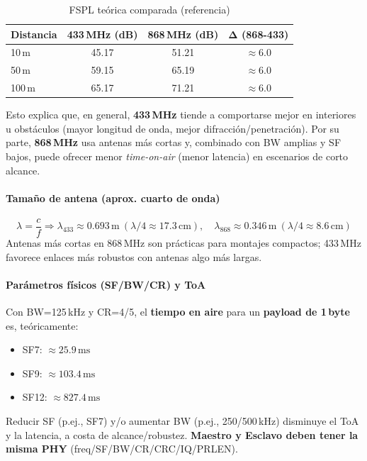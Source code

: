 \documentclass[a4paper,12pt]{article}
\begin{document}
\begin{table}[H]
\centering
\caption{FSPL teórica comparada (referencia)}
\label{tab:fspl}
\begin{tabular}{lccc}
\toprule
\textbf{Distancia} & \textbf{433\,MHz (dB)} & \textbf{868\,MHz (dB)} & \textbf{Δ (868-433)} \\
\midrule
10\,m  & 45.17 & 51.21 & \(\approx 6.0\) \\
50\,m  & 59.15 & 65.19 & \(\approx 6.0\) \\
100\,m & 65.17 & 71.21 & \(\approx 6.0\) \\
\bottomrule
\end{tabular}
\end{table}

\noindent
Esto explica que, en general, \textbf{433\,MHz} tiende a comportarse mejor en interiores u obstáculos (mayor longitud de onda, mejor difracción/penetración). 
Por su parte, \textbf{868\,MHz} usa antenas más cortas y, combinado con BW amplias y SF bajos, puede ofrecer menor \textit{time-on-air} (menor latencia) en escenarios de corto alcance.

\paragraph{Tamaño de antena (aprox. cuarto de onda)}
\[
\lambda = \frac{c}{f} \Rightarrow \lambda_{433}\approx 0.693\,\mathrm{m} \ (\lambda/4\approx 17.3\,\mathrm{cm}),\quad 
\lambda_{868}\approx 0.346\,\mathrm{m} \ (\lambda/4\approx 8.6\,\mathrm{cm})
\]
Antenas más cortas en 868\,MHz son prácticas para montajes compactos; 433\,MHz favorece enlaces más robustos con antenas algo más largas.

\paragraph{Parámetros físicos (SF/BW/CR) y ToA}
Con BW=125\,kHz y CR=4/5, el \textbf{tiempo en aire} para un \textbf{payload de 1\,byte} es, teóricamente:
\begin{itemize}
  \item SF7: \(\approx 25.9\,\mathrm{ms}\)
  \item SF9: \(\approx 103.4\,\mathrm{ms}\)
  \item SF12: \(\approx 827.4\,\mathrm{ms}\)
\end{itemize}
Reducir SF (p.ej., SF7) y/o aumentar BW (p.ej., 250/500\,kHz) disminuye el ToA y la latencia, a costa de alcance/robustez. 
\textbf{Maestro y Esclavo deben tener la misma PHY} (freq/SF/BW/CR/CRC/IQ/PRLEN).
\end{document}
